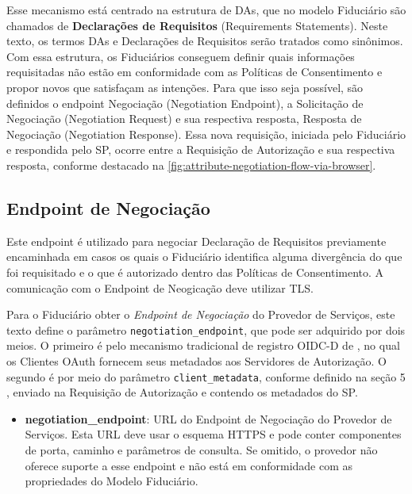 Esse mecanismo está centrado na estrutura de \acs{DA}s, que no modelo Fiduciário são chamados de \textbf{Declarações de Requisitos} (Requirements Statements). Neste texto, os termos \acs{DA}s e Declarações de Requisitos serão tratados como sinônimos. Com essa estrutura, os Fiduciários conseguem definir quais informações requisitadas não estão em conformidade com as Políticas de Consentimento e propor novos que satisfaçam as intenções. Para que isso seja possível, são definidos o endpoint Negociação (Negotiation Endpoint), a Solicitação de Negociação (Negotiation Request) e sua respectiva resposta, Resposta de Negociação (Negotiation Response). 
Essa nova requisição, iniciada pelo Fiduciário e respondida pelo \acs{SP}, ocorre entre a Requisição de Autorização e sua respectiva resposta, conforme destacado na \autoref{fig:attribute-negotiation-flow-via-browser}.



\subsection{Endpoint de Negociação}\label{subsection:endpoint-negociação}

Este endpoint é utilizado para negociar Declaração de Requisitos previamente encaminhada em casos os quais o Fiduciário identifica alguma divergência do que foi requisitado e o que é autorizado dentro das Políticas de Consentimento. A comunicação com o Endpoint de Neogicação deve utilizar TLS.

Para o Fiduciário obter o \emph{Endpoint de Negociação} do Provedor de Serviços, este texto define o parâmetro \texttt{negotiation\_endpoint}, que pode ser adquirido por dois meios. O primeiro é pelo mecanismo tradicional de registro \acs{OIDC-D} de \cite{sakimura2023openidDiscovery}, no qual os Clientes OAuth fornecem seus metadados aos Servidores de Autorização. O segundo é por meio do parâmetro \texttt{client\_metadata}, conforme definido na seção 5 \cite{OIDC4VP2023}, enviado na Requisição de Autorização e contendo os metadados do \acs{SP}.

\begin{itemize}
    \item \textbf{negotiation\_endpoint}: URL do Endpoint de Negociação do Provedor de Serviços. Esta URL deve usar o esquema HTTPS e pode conter componentes de porta, caminho e parâmetros de consulta. Se omitido, o provedor não oferece suporte a esse endpoint e não está em conformidade com as propriedades do Modelo Fiduciário.
\end{itemize}

